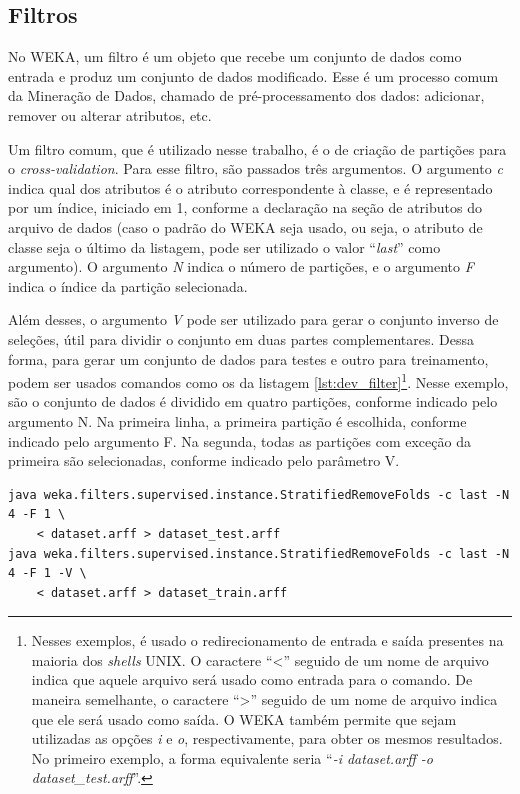 \subsection{Filtros}
\label{sec:dev_weka_filters}

No WEKA, um filtro é um objeto que recebe um conjunto de dados como entrada e produz um conjunto de dados modificado. Esse é um processo comum da Mineração de Dados, chamado de pré-processamento dos dados: adicionar, remover ou alterar atributos, etc.

Um filtro comum, que é utilizado nesse trabalho, é o de criação de partições para o \emph{cross-validation}. Para esse filtro, são passados três argumentos. O argumento \emph{c} indica qual dos atributos é o atributo correspondente à classe, e é representado por um índice, iniciado em 1, conforme a declaração na seção de atributos do arquivo de dados (caso o padrão do WEKA seja usado, ou seja, o atributo de classe seja o último da listagem, pode ser utilizado o valor ``\emph{last}'' como argumento). O argumento \emph{N} indica o número de partições, e o argumento \emph{F} indica o índice da partição selecionada.

Além desses, o argumento \emph{V} pode ser utilizado para gerar o conjunto inverso de seleções, útil para dividir o conjunto em duas partes complementares. Dessa forma, para gerar um conjunto de dados para testes e outro para treinamento, podem ser usados comandos como os da listagem \ref{lst:dev_filter}\footnote{Nesses exemplos, é usado o redirecionamento de entrada e saída presentes na maioria dos \emph{shells} UNIX. O caractere ``<'' seguido de um nome de arquivo indica que aquele arquivo será usado como entrada para o comando. De maneira semelhante, o caractere ``>'' seguido de um nome de arquivo indica que ele será usado como saída. O WEKA também permite que sejam utilizadas as opções \emph{i} e \emph{o}, respectivamente, para obter os mesmos resultados. No primeiro exemplo, a forma equivalente seria ``\emph{-i dataset.arff -o dataset\_test.arff}''.}. Nesse exemplo, são o conjunto de dados é dividido em quatro partições, conforme indicado pelo argumento N. Na primeira linha, a primeira partição é escolhida, conforme indicado pelo argumento F. Na segunda, todas as partições com exceção da primeira são selecionadas, conforme indicado pelo parâmetro V.

\begin{lstlisting}[caption=Filtro para geração de partições para \emph{cross-validation}, label=lst:dev_filter]
java weka.filters.supervised.instance.StratifiedRemoveFolds -c last -N 4 -F 1 \
    < dataset.arff > dataset_test.arff
java weka.filters.supervised.instance.StratifiedRemoveFolds -c last -N 4 -F 1 -V \
    < dataset.arff > dataset_train.arff
\end{lstlisting}

